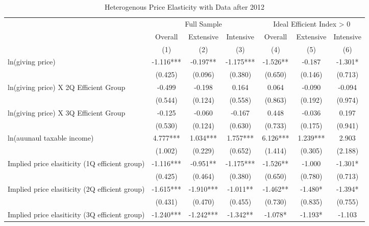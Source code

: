 \documentclass[ review  , 3p ]{elsarticle}
\begin{document}
  \begin{table}
  
  \caption{\label{tab:kableHeteroShortElasticity}Heterogenous Price Elasticity with Data after 2012}
  \centering
  \fontsize{8}{10}\selectfont
  \begin{threeparttable}
  \begin{tabular}[t]{lcccccc}
  \toprule
  \multicolumn{1}{c}{ } & \multicolumn{3}{c}{Full Sample} & \multicolumn{3}{c}{Ideal Efficient Index > 0} \\
  \cmidrule(l{3pt}r{3pt}){2-4} \cmidrule(l{3pt}r{3pt}){5-7}
  \multicolumn{1}{c}{ } & \multicolumn{1}{c}{Overall} & \multicolumn{1}{c}{Extensive} & \multicolumn{1}{c}{Intensive} & \multicolumn{1}{c}{Overall} & \multicolumn{1}{c}{Extensive} & \multicolumn{1}{c}{Intensive} \\
  \cmidrule(l{3pt}r{3pt}){2-2} \cmidrule(l{3pt}r{3pt}){3-3} \cmidrule(l{3pt}r{3pt}){4-4} \cmidrule(l{3pt}r{3pt}){5-5} \cmidrule(l{3pt}r{3pt}){6-6} \cmidrule(l{3pt}r{3pt}){7-7}
   & (1) & (2) & (3) & (4) & (5) & (6)\\
  \midrule
  ln(giving price) & -1.116*** & -0.197** & -1.175*** & -1.526** & -0.187 & -1.301*\\
   & (0.425) & (0.096) & (0.380) & (0.650) & (0.146) & (0.713)\\
  ln(giving price) X 2Q Efficient Group & -0.499 & -0.198 & 0.164 & 0.064 & -0.090 & -0.094\\
   & (0.544) & (0.124) & (0.558) & (0.863) & (0.192) & (0.974)\\
  ln(giving price) X 3Q Efficient Group & -0.125 & -0.060 & -0.167 & 0.448 & -0.036 & 0.197\\
   & (0.530) & (0.124) & (0.630) & (0.733) & (0.175) & (0.941)\\
  ln(auunaul taxable income) & 4.777*** & 1.034*** & 1.757*** & 6.126*** & 1.239*** & 2.903\\
   & (1.002) & (0.229) & (0.652) & (1.414) & (0.305) & (2.188)\\
  Implied price elasiticity (1Q efficient group) & -1.116*** & -0.951** & -1.175*** & -1.526** & -1.000 & -1.301*\\
   & (0.425) & (0.464) & (0.380) & (0.650) & (0.780) & (0.713)\\
  Implied price elasiticity (2Q efficient group) & -1.615*** & -1.910*** & -1.011** & -1.462** & -1.480* & -1.394*\\
   & (0.431) & (0.470) & (0.455) & (0.730) & (0.835) & (0.755)\\
  Implied price elasiticity (3Q efficient group) & -1.240*** & -1.242*** & -1.342** & -1.078* & -1.193* & -1.103\\

\end{tabular}
\end{threeparttable}
\end{table}
\end{document}
